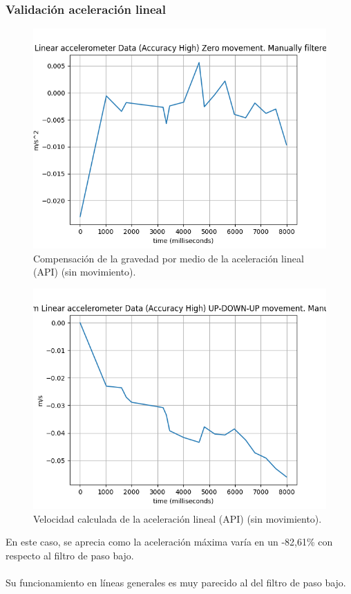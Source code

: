 \subsubsection{Validación aceleración lineal}

\begin{figure}[H]
	\centering
	\includegraphics[scale=0.5]{imagenes/linearGoogleZero.png}
	\caption{Compensación de la gravedad por medio de la aceleración lineal (API) (sin movimiento).}
	\label{Movimiento cero aceleracion lineal}
\end{figure}

\begin{figure}[H]
	\centering
	\includegraphics[scale=0.5]{imagenes/linearGoogleZeroSpeed.png}
	\caption{Velocidad calculada de la aceleración lineal (API) (sin movimiento).}
	\label{Velocidad cero aceleracion lineal}
\end{figure}
\noindent
En este caso, se aprecia como la aceleración máxima varía en un -82,61\% con respecto al filtro de paso bajo.
\\
\\
Su funcionamiento en líneas generales es muy parecido al del filtro de paso bajo.

